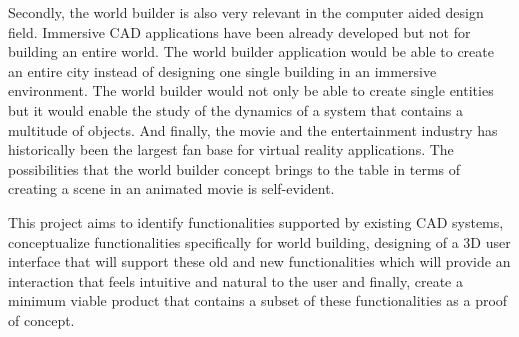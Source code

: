 Secondly, the world builder is also very relevant in the computer aided design field. Immersive CAD applications have been already developed but not for
 building an entire world. The world builder application would be able to create an entire city instead of designing one single building in an immersive 
 environment. The world builder would not only be able to create single entities but it would enable the study of the dynamics of a system that contains
  a multitude of objects. And finally, the movie and the entertainment industry has historically been the largest fan base for virtual reality 
  applications. The possibilities that the world builder concept brings to the table in terms of creating a scene in an animated movie is self-evident.


This project aims to identify functionalities supported by existing CAD systems, conceptualize functionalities specifically for world building, 
designing of a 3D user interface that will support these old and new functionalities which will provide an interaction that feels intuitive and natural to the user and finally, create a minimum viable product that contains a subset of these functionalities as a proof of concept.




























